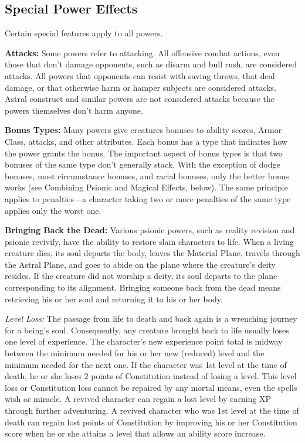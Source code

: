 \subsection{Special Power Effects}
Certain special features apply to all powers.

\textbf{Attacks:} Some powers refer to attacking. All offensive combat actions, even those that don't damage opponents, such as disarm and bull rush, are considered attacks. All powers that opponents can resist with saving throws, that deal damage, or that otherwise harm or hamper subjects are considered attacks. Astral construct and similar powers are not considered attacks because the powers themselves don't harm anyone.

\textbf{Bonus Types:} Many powers give creatures bonuses to ability scores, Armor Class, attacks, and other attributes. Each bonus has a type that indicates how the power grants the bonus. The important aspect of bonus types is that two bonuses of the same type don't generally stack. With the exception of dodge bonuses, most circumstance bonuses, and racial bonuses, only the better bonus works (see Combining Psionic and Magical Effects, below). The same principle applies to penalties---a character taking two or more penalties of the same type applies only the worst one.

\textbf{Bringing Back the Dead:} Various psionic powers, such as reality revision and psionic revivify, have the ability to restore slain characters to life. When a living creature dies, its soul departs the body, leaves the Material Plane, travels through the Astral Plane, and goes to abide on the plane where the creature's deity resides. If the creature did not worship a deity, its soul departs to the plane corresponding to its alignment. Bringing someone back from the dead means retrieving his or her soul and returning it to his or her body.

\textit{Level Loss:} The passage from life to death and back again is a wrenching journey for a being's soul. Consequently, any creature brought back to life usually loses one level of experience. The character's new experience point total is midway between the minimum needed for his or her new (reduced) level and the minimum needed for the next one. If the character was 1st level at the time of death, he or she loses 2 points of Constitution instead of losing a level. This level loss or Constitution loss cannot be repaired by any mortal means, even the spells wish or miracle. A revived character can regain a lost level by earning XP through further adventuring. A revived character who was 1st level at the time of death can regain lost points of Constitution by improving his or her Constitution score when he or she attains a level that allows an ability score increase.

